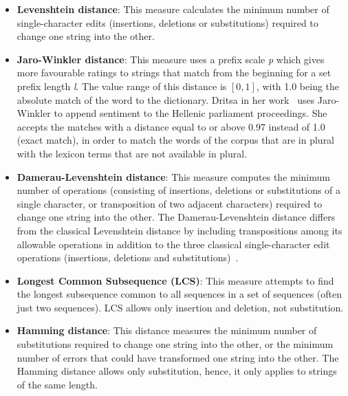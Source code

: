 \begin{itemize}
 \begin{itemize}
  \item \textbf{Levenshtein distance}:
  This measure calculates the minimum number of single-character edits
  (insertions, deletions or substitutions) required to change one string
  into the other.
  
  \item \textbf{Jaro-Winkler distance}:
  This measure uses a prefix scale \emph{p}
  which gives more favourable ratings to strings
  that match from the beginning for a set prefix length \emph{l}.
  The value range of this distance is $[0,1]$,
  with 1.0 being the absolute match of the word to the dictionary.
  Dritsa in her work~\cite{Dri18} uses Jaro-Winkler
  to append sentiment to the Hellenic parliament proceedings.
  She accepts the matches with a distance equal to or above 0.97 instead of 1.0
  (exact match), in order to match the words of the corpus that are in plural
  with the lexicon terms that are not available in plural.
  
  \item \textbf{Damerau-Levenshtein distance}:
  This measure computes the minimum number of operations
  (consisting of insertions, deletions or substitutions of a single character,
  or transposition of two adjacent characters)
  required to change one string into the other.
  The Damerau-Levenshtein distance differs from the classical Levenshtein distance
  by including transpositions among its allowable operations
  in addition to the three classical single-character edit operations
  (insertions, deletions and substitutions)~\cite{Bar07,Lev66}.
  
  \item \textbf{Longest Common Subsequence (LCS)}:
  This measure attempts to find the longest subsequence common to all sequences
  in a set of sequences (often just two sequences).
  LCS allows only insertion and deletion, not substitution.
  
  \item \textbf{Hamming distance}:
  This distance measures the minimum number of substitutions
  required to change one string into the other,
  or the minimum number of errors that could have transformed one string into the other.
  The Hamming distance allows only substitution,
  hence, it only applies to strings of the same length.
  \end{itemize}
 
\end{itemize}

